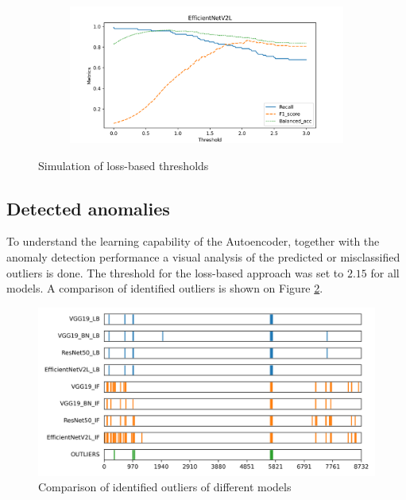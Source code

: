 \begin{figure}[!ht]
\begin{subfigure}{0.48\textwidth}
    \end{subfigure}
    \begin{subfigure}{0.48\textwidth}
        \centering
        \includegraphics[width=\textwidth]{./results/comparison/EfficientNetV2L_threshold.png}
    \end{subfigure}
    \caption{Simulation of loss-based thresholds}
    \label{fig:threshold_simulation}
\end{figure}

\subsection{Detected anomalies}
To understand the learning capability of the Autoencoder, together with the anomaly detection
performance a visual analysis of the predicted or misclassified outliers is done.
The threshold for the loss-based approach was set to $2.15$ for all models.
A comparison of identified outliers is shown on Figure \ref{fig:outlier_comparison}.

\begin{figure}[!ht]
    \centering
    \includegraphics[width=\textwidth]{./results/comparison/outlier_comparison.png}
    \caption{Comparison of identified outliers of different models}
    \label{fig:outlier_comparison}
\end{figure}

